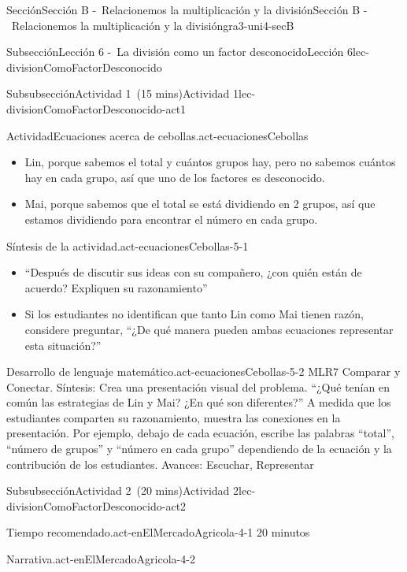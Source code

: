 \documentclass[oneside,10pt,]{article}
\begin{document}
\begin{sectionptx}{Sección}{Sección B -~Relacionemos la multiplicación y la división}{}{Sección B -~Relacionemos la multiplicación y la división}{}{}{gra3-uni4-secB}
\begin{subsectionptx}{Subsección}{Lección 6 -~La división como un factor desconocido}{}{Lección 6}{}{}{lec-divisionComoFactorDesconocido}
\begin{subsubsectionptx}{Subsubsección}{Actividad 1~(15 mins)}{}{Actividad 1}{}{}{lec-divisionComoFactorDesconocido-act1}
\begin{activity}{Actividad}{Ecuaciones acerca de cebollas.}{act-ecuacionesCebollas}
\begin{itemize}[label=\textbullet]
\item{}Lin, porque sabemos el total y cuántos grupos hay, pero no sabemos cuántos hay en cada grupo, así que uno de los factores es desconocido.%
\item{}Mai, porque sabemos que el total se está dividiendo en 2 grupos, así que estamos dividiendo para encontrar el número en cada grupo.%
\end{itemize}
\end{activity}%
%
\par
\begin{paragraphs}{Síntesis de la actividad.}{act-ecuacionesCebollas-5-1}%
%
\begin{itemize}[label=\textbullet]
\item{}``Después de discutir sus ideas con su compañero, ¿con quién están de acuerdo? Expliquen su razonamiento''%
\item{}Si los estudiantes no identifican que tanto Lin como Mai tienen razón, considere preguntar, ``¿De qué manera pueden ambas ecuaciones representar esta situación?''%
\end{itemize}
\end{paragraphs}%
\begin{paragraphs}{Desarrollo de lenguaje matemático.}{act-ecuacionesCebollas-5-2}%
MLR7 Comparar y Conectar. Síntesis: Crea una presentación visual del problema. ``¿Qué tenían en común las estrategias de Lin y Mai? ¿En qué son diferentes?'' A medida que los estudiantes comparten su razonamiento, muestra las conexiones en la presentación. Por ejemplo, debajo de cada ecuación, escribe las palabras ``total'', ``número de grupos'' y ``número en cada grupo'' dependiendo de la ecuación y la contribución de los estudiantes. Avances: Escuchar, Representar%
\end{paragraphs}%
\end{subsubsectionptx}
%
%
\typeout{************************************************}
\typeout{************************************************}
%
\begin{subsubsectionptx}{Subsubsección}{Actividad 2~(20 mins)}{}{Actividad 2}{}{}{lec-divisionComoFactorDesconocido-act2}
\par
\begin{paragraphs}{Tiempo recomendado.}{act-enElMercadoAgricola-4-1}%
20 minutos%
\end{paragraphs}%
\begin{paragraphs}{Narrativa.}{act-enElMercadoAgricola-4-2}%

\end{paragraphs}
\end{subsubsectionptx}
\end{subsectionptx}
\end{sectionptx}
\end{document}
